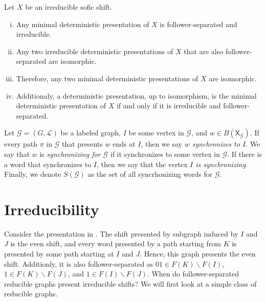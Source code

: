 \documentclass[hidelinks]{article}
\newcommand{\Lc}{\mathcal{L}}  %
\newcommand{\Gc}{\mathcal{G}}  %
\newcommand{\shift}[1]{\mathsf{X}_{#1}}
\newcommand{\term}[1]{\textit{#1}}
\theoremstyle{definition}
\begin{document}
\begin{theorem}[name=\cite{lind1995introduction} Fundamental theorem of minimal deterministic presentations of irreducible sofic shifts]
    Let \(X\) be an irreducible sofic shift.
    \begin{enumerate}[(i)]
        \item Any minimal deterministic presentation of \(X\) is follower-separated and irreducible.
        \item Any two irreducible deterministic presentations of \(X\) 
        that are also follower-\\separated are isomorphic.
        \item Therefore, any two minimal deterministic presentations of \(X\) are isomorphic.
        \item Additionaly, a deterministic presentation, up to isomorphism, is the minimal deterministic presentation of \(X\)
        if and only if it is irreducible and follower-separated.
    \end{enumerate}
\end{theorem}

\begin{definition}
    Let \(\Gc = (G, \Lc)\) be a labeled graph, \(I\) be some vertex in \(\Gc\), and \(w \in B(\shift{\Gc})\).
    If every path \(\pi\) in \(\Gc\) that presents \(w\) ends at \(I\), then we say \term{\(w\) synchronizes to \(I\)}.
    We say that \(w\) is \term{synchronizing for \(\Gc\)} if it synchronizes to some vertex in \(\Gc\). 
    If there is a word that synchronizes to \(I\), then we say that the vertex \term{\(I\) is synchronizing}.
    Finally, we denote 
    \(S(\Gc)\) as the set of all syncrhonizing words for \(\Gc\).
\end{definition}

\section{Irreducibility}

Consider the presentation in .
The shift presented by subgraph induced by \(I\) and \(J\) is the even shift, and every 
word presented by a path starting from \(K\) is presented by some path starting at 
\(I\) and \(J\). Hence, this graph presents the even shift. Additionly, it is 
also follower-separated as \(01 \in F(K)\backslash F(I)\), \(1 \in F(K)\backslash F(J)\),
and \(1 \in F(I) \backslash F(J)\). 
When do follower-separated reducible graphs present irreducible shifts? We will first look 
at a simple class of reducible graphs.
\end{document}
